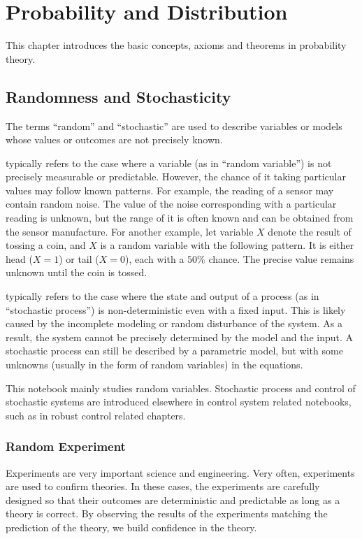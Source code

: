 \chapter{Probability and Distribution} \label{ch:pbbasics}

This chapter introduces the basic concepts, axioms and theorems in probability theory.

\section{Randomness and Stochasticity}

The terms ``random'' and ``stochastic'' are used to describe variables or models whose values or outcomes are not precisely known.

 typically refers to the case where a variable (as in ``random variable'') is not precisely measurable or predictable. However, the chance of it taking particular values may follow known patterns. For example, the reading of a sensor may contain random noise. The value of the noise corresponding with a particular reading is unknown, but the range of it is often known and can be obtained from the sensor manufacture. For another example, let variable $X$ denote the result of tossing a coin, and $X$ is a random variable with the following pattern. It is either head ($X=1$) or tail ($X=0$), each with a $50\%$ chance. The precise value remains unknown until the coin is tossed.

 typically refers to the case where the state and output of a process (as in ``stochastic process'') is non-deterministic even with a fixed input. This is likely caused by the incomplete modeling or random disturbance of the system. As a result, the system cannot be precisely determined by the model and the input. A stochastic process can still be described by a parametric model, but with some unknowns (usually in the form of random variables) in the equations.

This notebook mainly studies random variables. Stochastic process and control of stochastic systems are introduced elsewhere in control system related notebooks, such as in robust control related chapters.

\subsection{Random Experiment}

Experiments are very important science and engineering. Very often, experiments are used to confirm theories. In these cases, the experiments are carefully designed so that their outcomes are deterministic and predictable as long as a theory is correct. By observing the results of the experiments matching the prediction of the theory, we build confidence in the theory.

